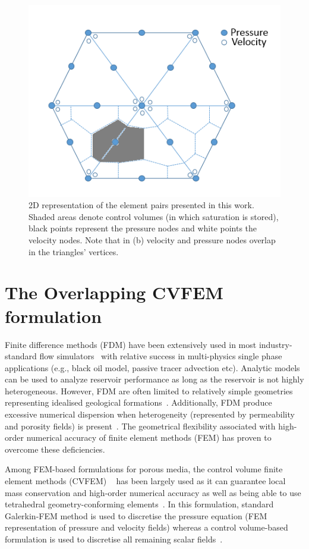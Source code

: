 \documentclass[preprint,authoryear,12pt]{elsarticle}
\begin{document}
\begin{figure}[h]
\centering
\includegraphics[width=.5\textwidth]{./Pics/P1DGP2.PNG}
\caption{2D representation of the element pairs presented in this work. Shaded areas denote control volumes (in which saturation is stored), black points represent the pressure nodes and white points the velocity nodes. Note that in (b) velocity and pressure nodes overlap in the triangles' vertices.}
\label{fig:fem_cv}
\end{figure}

\section{The Overlapping CVFEM formulation}

Finite difference methods (FDM) have been extensively used in most industry-standard flow simulators~\citep{aziz_1986, chen_2005, chang_1990} with relative success in multi-physics single phase applications (e.g., black oil model, passive tracer advection etc). Analytic models can be used to analyze reservoir performance as long as the reservoir is not highly heterogeneous. However, FDM are often limited to relatively simple geometries 
representing idealised geological formations~\citep{mlacnik_2004, king_1999}. Additionally, FDM produce excessive numerical dispersion when heterogeneity (represented by permeability and porosity fields) is present~\citep{chavent_1986}. The geometrical flexibility associated with high-order numerical accuracy of finite element methods (FEM) has proven to overcome these deficiencies. 

Among FEM-based formulations for porous media, the control volume finite element methods (CVFEM) ~\citep[CVFEM,][]{fung_1992,cordazzo_2004} has been largely used as it can guarantee local mass conservation and high-order numerical accuracy as well as being able to use tetrahedral geometry-conforming elements~\citep{forsyth_1990, geiger_2004, hurtado_2007}. In this formulation, standard Galerkin-FEM method is used to discretise the pressure equation (FEM representation of pressure and velocity fields) whereas a control volume-based formulation is used to discretise all remaining scalar fields~\citep[e.g., saturation, density, species concentration etc, see][]{gomes_book_2012}. 
\end{document}
